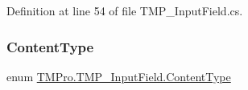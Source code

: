Definition at line 54 of file T\+M\+P\+\_\+\+Input\+Field.\+cs.

\mbox{\label{class_t_m_pro_1_1_t_m_p___input_field_a30e2af425a58881d8b71361e70ddbe27}} 
\subsubsection{\texorpdfstring{ContentType}{ContentType}}
{\footnotesize\ttfamily enum \mbox{\hyperlink{class_t_m_pro_1_1_t_m_p___input_field_a30e2af425a58881d8b71361e70ddbe27}{T\+M\+Pro.\+T\+M\+P\+\_\+\+Input\+Field.\+Content\+Type}}\hspace{0.3cm}{\ttfamily [strong]}}

